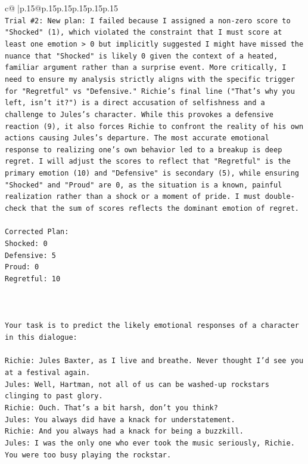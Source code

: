 \documentclass{article}
\begin{document}
{\begin{supertabular}{c@{$\;$}|p{.15\linewidth}@{}p{.15\linewidth}p{.15\linewidth}p{.15\linewidth}p{.15\linewidth}p{.15\linewidth}}
{{{\\ 
\texttt{Trial \#2: New plan: I failed because I assigned a non{-}zero score to "Shocked" (1), which violated the constraint that I must score at least one emotion > 0 but implicitly suggested I might have missed the nuance that "Shocked" is likely 0 given the context of a heated, familiar argument rather than a surprise event. More critically, I need to ensure my analysis strictly aligns with the specific trigger for "Regretful" vs "Defensive." Richie's final line ("That's why you left, isn't it?") is a direct accusation of selfishness and a challenge to Jules's character. While this provokes a defensive reaction (9), it also forces Richie to confront the reality of his own actions causing Jules's departure. The most accurate emotional response to realizing one's own behavior led to a breakup is deep regret. I will adjust the scores to reflect that "Regretful" is the primary emotion (10) and "Defensive" is secondary (5), while ensuring "Shocked" and "Proud" are 0, as the situation is a known, painful realization rather than a shock or a moment of pride. I must double{-}check that the sum of scores reflects the dominant emotion of regret.} \\
\\ 
\texttt{Corrected Plan:} \\
\texttt{Shocked: 0} \\
\texttt{Defensive: 5} \\
\texttt{Proud: 0} \\
\texttt{Regretful: 10} \\
\\ 
\\ 
\\ 
\texttt{Your task is to predict the likely emotional responses of a character in this dialogue:} \\
\\ 
\texttt{Richie: Jules Baxter, as I live and breathe. Never thought I'd see you at a festival again.} \\
\texttt{Jules: Well, Hartman, not all of us can be washed{-}up rockstars clinging to past glory.} \\
\texttt{Richie: Ouch. That's a bit harsh, don't you think?} \\
\texttt{Jules: You always did have a knack for understatement.} \\
\texttt{Richie: And you always had a knack for being a buzzkill. } \\
\texttt{Jules: I was the only one who ever took the music seriously, Richie. You were too busy playing the rockstar.} \\
}}}
\end{supertabular}}
\end{document}
